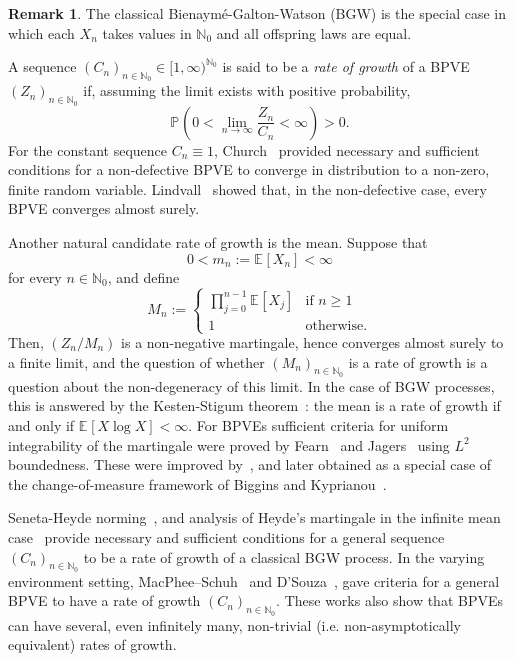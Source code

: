 \documentclass[12pt]{article}
\theoremstyle{definition}
\newtheorem{rmq}[thm]{Remark}
\newcommand{\E}[2][]{\ensuremath{\mathbb{E}_{#1}\left[#2 \right]}}
\newcommand{\Prob}[2][]{\ensuremath{\mathbb{P}_{#1} \left(#2 \right)}}
\begin{document}
\begin{rmq}
    The classical Bienaym\'e-Galton-Watson (BGW) is the special case in which each $X_n$ takes values in $\mathbb{N}_0$ and all offspring laws are equal. 
\end{rmq}

A sequence $(C_{n})_{n \in \mathbb{N}_0} \in [1, \infty)^{\mathbb{N}_0}$ is said to be a \emph{rate of growth} of a BPVE $(Z_{n})_{n \in \mathbb{N}_0}$ if, assuming the limit exists with positive probability, 
\[
\Prob{0 < \lim_{n \to \infty} \frac{Z_{n}}{C_{n}} < \infty} > 0. 
\]
For the constant sequence $C_{n} \equiv 1$, Church~\cite{church} provided necessary and sufficient conditions for a non-defective BPVE to converge in distribution to a non-zero, finite random variable. Lindvall~\cite{lindval} showed that, in the non-defective case, every BPVE converges almost surely. 

Another natural candidate rate of growth is the mean. Suppose that 
\begin{equation} \label{eq:possibly-new-equation}
0 < m_{n} := \E{X_{n}} < \infty 
\end{equation}
for every $n \in \mathbb{N}_0$, and define 
\begin{equation} \label{eq:mean-bpve}
M_{n} := \begin{cases}
    \prod_{j=0}^{n-1} \E{X_{j}} & \text{if $n \geq 1$} \\
    1 & \text{otherwise}. 
\end{cases}
\end{equation}
Then, $(Z_{n}/M_{n})$ is a non-negative martingale, hence converges almost surely to a finite limit, and the question of whether $(M_{n})_{n \in \mathbb{N}_0}$ is a rate of growth is a question about the non-degeneracy of this limit. In the case of BGW processes, this is answered by the Kesten-Stigum theorem~\cite{kesten-stigum, conceptual-xlogx}: the mean is a rate of growth if and only if $\E{X \log{X}} < \infty$. For BPVEs sufficient criteria for uniform integrability of the martingale were proved by Fearn~\cite{fearn} and Jagers~\cite{Jagers} using $L^2$ boundedness. These were improved by~\cite{goettge-suff}, and later obtained as a special case of the change-of-measure framework of Biggins and Kyprianou~\cite{measure-change}. 

Seneta-Heyde norming~\cite{seneta, Heyde}, and analysis of Heyde's martingale in the infinite mean case~\cite{schuh-barbour-infinite-mean} provide necessary and sufficient conditions for a general sequence $(C_{n})_{n \in \mathbb{N}_0}$ to be a rate of growth of a classical BGW process. In the varying environment setting, MacPhee--Schuh~\cite{macphee-schuh} and D'Souza~\cite{dsouza-rates-of-growth}, gave criteria for a general BPVE to have a rate of growth $(C_{n})_{n \in \mathbb{N}_0}$. These works also show that BPVEs can have several, even infinitely many, non-trivial (i.e. non-asymptotically equivalent) rates of growth. 
\end{document}
